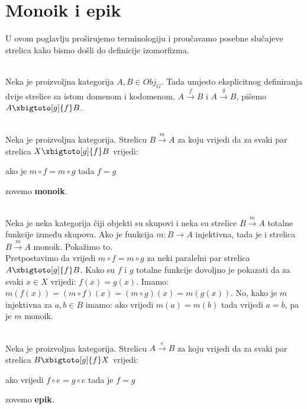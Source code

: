   \section{Monoik i epik}
  U ovom poglavlju proširujemo terminologiju i proučavamo posebne slučajeve
  strelica kako bismo došli do definicije izomorfizma.\\

  \begin{definition}\ \\

    \noindent Neka je  proizvoljna kategorija $A, B \in Obj_G$. Tada umjesto eksplicitnog definiranja dvije strelice sa istom domenom i kodomenom, $A \xrightarrow{f} B$  i $A \xrightarrow{g} B$,
    pišemo $ A \xbigtoto[g]{f} B$.
  \end{definition}

  \begin{definition}\ \\
  
    \noindent Neka je  proizvoljna kategorija. Strelicu $B \xrightarrow{m} A$
    za koju vrijedi da za svaki par strelica
     $ X \xbigtoto[g]{f} B$
    vrijedi:
    \begin{center}
    ako je $m \circ f = m \circ g$ tada $f = g$
    \end{center}
    zovemo \textbf{monoik}.\\
  \end{definition}
  
\begin{example}\ \\

  \label{mon:pr:1}
    \noindent Neka je  neka kategorija čiji objekti su skupovi i neka su strelice
    $B \xrightarrow{m} A$ totalne funkcije između skupova.
    Ako je funkcija $m: B \to A$ injektivna, tada je i strelica $B \xrightarrow{m} A$ monoik. Pokažimo to.\\    
    \noindent Pretpostavimo da vrijedi $ m \circ f = m \circ g$ \label{me:pr:1}
    za neki paralelni par strelica $A \xbigtoto[g]{f} B$. Kako su $f$ i $g$ totalne funkcije dovoljno je pokazati da za svaki $x \in X$ vrijedi: $f(x) = g(x)$. Imamo:
     $m(f(x)) = (m \circ f)(x) \overset{}{=} (m \circ g)(x) = m(g(x))$.
    No, kako je $m$ injektivna za $a, b \in B$ imamo:
     ako vrijedi $m(a) = m(b)$ tada vrijedi $a = b$,
   	pa je $m$ monoik.\\
\end{example}

  \begin{definition}\ \\
  
    \noindent Neka je  proizvoljna kategorija. Strelicu $A \xrightarrow{e} B$ za koju vrijedi da za svaki par strelica $B \xbigtoto[g]{f} X$ vrijedi:
    \begin{center}
      ako vrijedi $f \circ e = g \circ e$ tada je $f = g$
    \end{center}
      zovemo \textbf{epik}.
  \end{definition}
  
